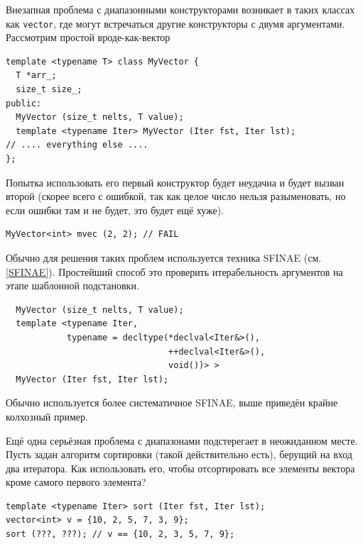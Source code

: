 \documentclass[a4paper,12pt,oneside]{article}
\newif\ifanswers
\begin{document}
\ifanswers
\begin{lstlisting}
template <typename Iter> MyArray (Iter fst, Iter lst) {
  int idx = 0;
  for (auto it = fst; it != lst; ++i) {
    assert (idx < S);
    arr[idx++] = *it;
  }
}
\end{lstlisting}
\fi

Внезапная проблема с диапазонными конструкторами возникает в таких классах как \lstinline!vector!, где могут встречаться другие конструкторы с двумя аргументами. Рассмотрим простой вроде-как-вектор

\begin{lstlisting}
template <typename T> class MyVector {
  T *arr_;
  size_t size_;
public:
  MyVector (size_t nelts, T value);
  template <typename Iter> MyVector (Iter fst, Iter lst);
// .... everything else ....
};
\end{lstlisting}

Попытка использовать его первый конструктор будет неудачна и будет вызван второй (скорее всего с ошибкой, так как целое число нельзя разыменовать, но если ошибки там и не будет, это будет ещё хуже).

\begin{lstlisting}
MyVector<int> mvec (2, 2); // FAIL
\end{lstlisting}

Обычно для решения таких проблем используется техника SFINAE (см. \ref{SFINAE}). Простейший способ это проверить итерабельность аргументов на этапе шаблонной подстановки.

\begin{lstlisting}
  MyVector (size_t nelts, T value);
  template <typename Iter, 
            typename = decltype(*declval<Iter&>(),
                                ++declval<Iter&>(), 
                                void())> >
  MyVector (Iter fst, Iter lst);
\end{lstlisting}

Обычно используется более систематичное SFINAE, выше приведён крайне колхозный пример.

Ещё одна серьёзная проблема с диапазонами подстерегает в неожиданном месте. Пусть задан алгоритм сортировки (такой действительно есть), берущий на вход два итератора. Как использовать его, чтобы отсортировать все элементы вектора кроме самого первого элемента?

\begin{lstlisting}
template <typename Iter> sort (Iter fst, Iter lst);
vector<int> v = {10, 2, 5, 7, 3, 9};
sort (???, ???); // v == {10, 2, 3, 5, 7, 9};
\end{lstlisting}
\end{document}
